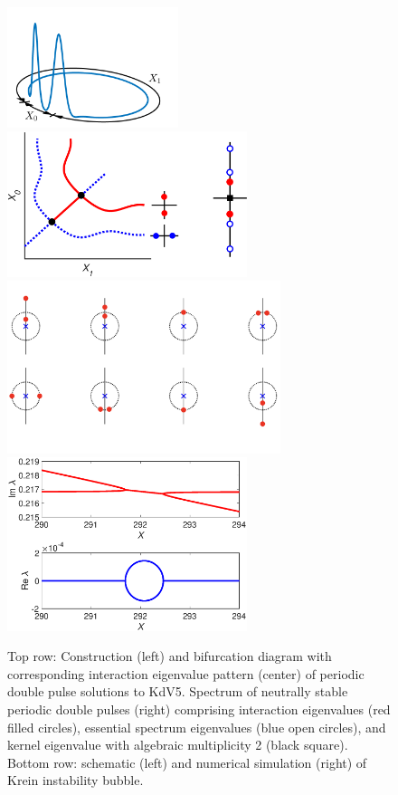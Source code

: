 \documentclass[11pt,reqno,oneside]{article}
\theoremstyle{definition}
\theoremstyle{remark}
\begin{document}
\begin{figure}
    \begin{center}
    \includegraphics[width=5cm]{images/2pulse3d.png}
    \includegraphics[width=7cm]{images/2pitchforkcoloreig2.eps}
    \includegraphics[width=8cm]{images/KreinBubbleCartoonSS2.png}
    \includegraphics[width=7cm]{images/kreinbubble1.eps}
    \end{center}
    \caption{Top row: Construction (left) and bifurcation diagram with corresponding interaction eigenvalue pattern (center) of periodic double pulse solutions to KdV5. Spectrum of neutrally stable periodic double pulses (right) comprising interaction eigenvalues (red filled circles), essential spectrum eigenvalues (blue open circles), and kernel eigenvalue with algebraic multiplicity 2 (black square).
    Bottom row: schematic (left) and numerical simulation (right) of Krein instability bubble.}
    \label{fig:periodic}
\end{figure}
\end{document}

